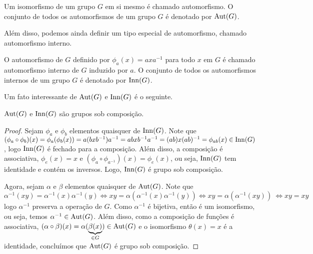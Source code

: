 	\begin{deff}
		\label{def automorfismo}
		Um isomorfismo de um grupo $G$ em si mesmo é chamado automorfismo. O conjunto de todos os automorfismos de um grupo $G$ é denotado por $\operatorname{Aut}(G)$.
	\end{deff}
	\par\vspace{0.3cm} Além disso, podemos ainda definir um tipo especial de automorfismo, chamado automorfismo interno.
	\begin{deff}
		\label{def automorfismo interno}
		O automorfismo de $G$ definido por $\phi_a(x) = axa^{-1}$ para todo $x$ em $G$ é chamado automorfismo interno de $G$ induzido por $a$. O conjunto de todos os automorfismos internos de um grupo $G$ é denotado por $\operatorname{Inn}(G)$.
	\end{deff}
	\par\vspace{0.3cm} Um fato interessante de $\operatorname{Aut}(G)$ e $\operatorname{Inn}(G)$ é o seguinte.
	\begin{theorem}
		$\operatorname{Aut}(G)$ e $\operatorname{Inn}(G)$ são grupos sob composição.
	\end{theorem}
	\begin{proof}
		\vspace{0.3cm}\par Sejam $\phi_a$ e $\phi_b$ elementos quaisquer de $\operatorname{Inn}(G)$. Note que $(\phi_a\circ\phi_b)(x) = \phi_a(\phi_b(x)) = a(bxb^{-1})a^{-1} = abxb^{-1}a^{-1} = (ab)x(ab)^{-1} = \phi_{ab}(x) \in \operatorname{Inn}(G)$, logo $\operatorname{Inn}(G)$ é fechado para a composição. Além disso, a composição é associativa, $\phi_e(x) = x$ e $(\phi_a\circ\phi_{a^{-1}})(x) = \phi_e(x)$, ou seja, $\operatorname{Inn}(G)$ tem identidade e contém os inversos. Logo, $\operatorname{Inn}(G)$ é grupo sob composição.
		
		\vspace{0.3cm}\par Agora, sejam $\alpha$ e $\beta$ elementos quaisquer de $\operatorname{Aut}(G)$. Note que 
		\begin{equation*}
		\alpha^{-1}(xy) = \alpha^{-1}(x)\alpha^{-1}(y) \Leftrightarrow xy = \alpha(\alpha^{-1}(x)\alpha^{-1}(y)) \Leftrightarrow xy = \alpha(\alpha^{-1}(xy))\ \Leftrightarrow xy = xy
		\end{equation*}
		logo $\alpha^{-1}$ preserva a operação de $G$. Como $\alpha^{-1}$ é bijetiva, então é um isomorfismo, ou seja, temos $\alpha^{-1}\in \operatorname{Aut}(G)$. Além disso, como a composição de funções é associativa, $(\alpha\circ\beta)(x) = \alpha(\underbrace{\beta(x)}_{\in G}) \in \operatorname{Aut}(G)$ e o isomorfismo $\theta(x) = x$ é a identidade, concluímos que $\operatorname{Aut}(G)$ é grupo sob composição.\end{proof}
